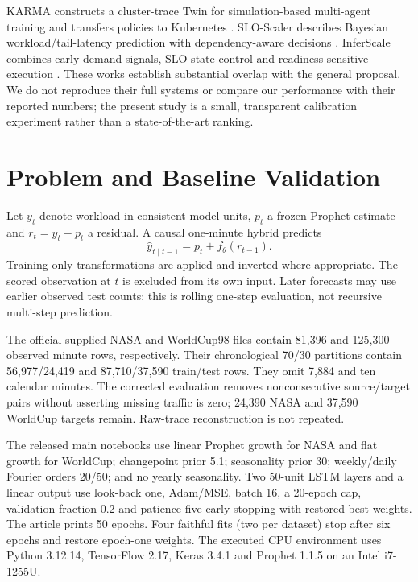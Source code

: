 \documentclass[11pt,a4paper]{article}
\begin{document}
KARMA constructs a cluster-trace Twin for simulation-based multi-agent training and transfers policies to Kubernetes \cite{karma}. SLO-Scaler describes Bayesian workload/tail-latency prediction with dependency-aware decisions \cite{sloscaler}. InferScale combines early demand signals, SLO-state control and readiness-sensitive execution \cite{inferscale}. These works establish substantial overlap with the general proposal. We do not reproduce their full systems or compare our performance with their reported numbers; the present study is a small, transparent calibration experiment rather than a state-of-the-art ranking.

\section{Problem and Baseline Validation}
Let $y_t$ denote workload in consistent model units, $p_t$ a frozen Prophet estimate and $r_t=y_t-p_t$ a residual. A causal one-minute hybrid predicts
\begin{equation}\widehat y_{t\mid t-1}=p_t+f_\theta(r_{t-1}).\end{equation}
Training-only transformations are applied and inverted where appropriate. The scored observation at $t$ is excluded from its own input. Later forecasts may use earlier observed test counts: this is rolling one-step evaluation, not recursive multi-step prediction.

The official supplied NASA and WorldCup98 files contain 81,396 and 125,300 observed minute rows, respectively. Their chronological 70/30 partitions contain 56,977/24,419 and 87,710/37,590 train/test rows. They omit 7,884 and ten calendar minutes. The corrected evaluation removes nonconsecutive source/target pairs without asserting missing traffic is zero; 24,390 NASA and 37,590 WorldCup targets remain. Raw-trace reconstruction is not repeated.

The released main notebooks use linear Prophet growth for NASA and flat growth for WorldCup; changepoint prior 5.1; seasonality prior 30; weekly/daily Fourier orders 20/50; and no yearly seasonality. Two 50-unit LSTM layers and a linear output use look-back one, Adam/MSE, batch 16, a 20-epoch cap, validation fraction 0.2 and patience-five early stopping with restored best weights. The article prints 50 epochs. Four faithful fits (two per dataset) stop after six epochs and restore epoch-one weights. The executed CPU environment uses Python 3.12.14, TensorFlow 2.17, Keras 3.4.1 and Prophet 1.1.5 on an Intel i7-1255U.
\end{document}

